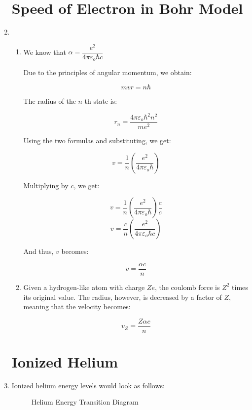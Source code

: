 \begin{enumerate}
    \section{Speed of Electron in Bohr Model}

  \item 

    \begin{enumerate}

      \item We know that $\alpha=\dfrac{e^2}{4\pi\varepsilon_o\hbar c}$

        Due to the principles of angular momentum, we obtain:

        $$mvr=n\hbar$$

        The radius of the $n$-th state is:

        $$r_n=\dfrac{4\pi\varepsilon_o\hbar^2n^2}{me^2}$$

        Using the two formulas and substituting, we get:

        $$v=\frac{1}{n}\left( \frac{e^2}{4\pi\varepsilon_o\hbar} \right)$$

        Multiplying by $c$, we get:

        $$v=\frac{1}{n}\left( \frac{e^2}{4\pi\varepsilon_o\hbar} \right)\frac{c}{c}$$
        $$v=\frac{c}{n}\left( \frac{e^2}{4\pi\varepsilon_o\hbar c} \right)$$

        And thus, $v$ becomes:

        $$v=\frac{\alpha c}{n}$$

      \item Given a hydrogen-like atom with charge $Ze$, the coulomb force is $Z^2$ times its original value. The radius, however, is decreased by a factor of $Z$, meaning that the velocity becomes:

        $$v_Z=\frac{Z\alpha c}{n}$$

    \end{enumerate}

    \section{Ionized Helium}

  \item Ionized helium energy levels would look as follows:

    \begin{figure}[h!]
      \centering
      
      \caption{Helium Energy Transition Diagram}
      \label{fig:1}
    \end{figure}


\end{enumerate}
